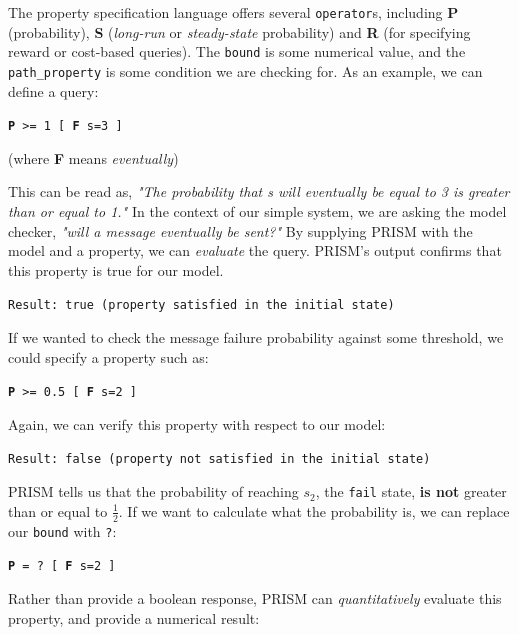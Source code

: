 \documentclass{l4proj}
\begin{document}
The property specification language offers several \texttt{operator}s, including \textbf{P} (probability), \textbf{S} (\textit{long-run} or \textit{steady-state} probability) and \textbf{R} (for specifying reward or cost-based queries). The \texttt{bound} is some numerical value, and the \texttt{path\_property} is some condition we are checking for. As an example, we can define a query:

\begin{center}
    \texttt{\textbf{P} >= 1 [ \textbf{F} s=3 ]}
    
    (where \textbf{F} means \textit{eventually})
\end{center}

This can be read as, \textit{"The probability that s will eventually be equal to 3 is greater than or equal to 1."} In the context of our simple system, we are asking the model checker, \textit{"will a message eventually be sent?"} By supplying PRISM with the model and a property, we can \textit{evaluate} the query. PRISM's output confirms that this property is true for our model.

\begin{center}
    \texttt{Result: true (property satisfied in the initial state)}
\end{center}

If we wanted to check the message failure probability against some threshold, we could specify a property such as:

\begin{center}
    \texttt{\textbf{P} >= 0.5 [ \textbf{F} s=2 ]}
\end{center}

Again, we can verify this property with respect to our model:

\begin{center}
    \texttt{Result: false (property not satisfied in the initial state)}
\end{center}

PRISM tells us that the probability of reaching $s_2$, the \texttt{fail} state, \textbf{is not} greater than or equal to \( \frac{1}{2} \). If we want to calculate what the probability is, we can replace our \texttt{bound} with \texttt{?}:

\begin{center}
    \texttt{\textbf{P} = ? [ \textbf{F} s=2 ]}
\end{center}

Rather than provide a boolean response, PRISM can \textit{quantitatively} evaluate this property, and provide a numerical result:
\end{document}
